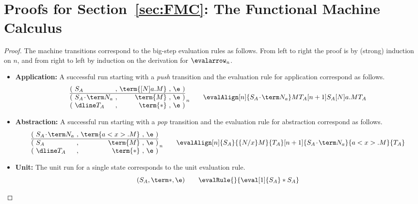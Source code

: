 \documentclass[10pt,a4paper]{amsart}
\newcommand\case[1]{\textbf{#1}}
\newcommand\msep{\kern1pt{\cdot}\kern1pt}
\begin{document}
\appendix
\setcounter{section}{1}

\section{Proofs for Section~\ref{sec:FMC}: The Functional Machine Calculus}

\smallStepBigStep*

\begin{proof}
The machine transitions correspond to the big-step evaluation rules as follows. From left to right the proof is by (strong) induction on $n$, and from right to left by induction on the derivation for $\evalarrow_n$.

\begin{itemize}
\item\case{Application:}
A successful run starting with a \emph{push} transition and the evaluation rule for application correspond as follows.
\[
\begin{array}{@{(~}l@{~,~}r@{~,~}r@{~)}}
          S_A               & \term{[N]a.M} & \e
\\ \hline S_A\msep\term N_a &      \term{M} & \e
\\ \dline T_A               &      \term{*} & \e
\end{array}
\,\raisebox{-4pt}{$\scriptstyle n$}
\qquad
\evalAlign 
  [n]   {S_A\msep\term N_a}       M  {T_A}
  [n+1] {S_A}               {[N]a.M} {T_A}
\]

\item\case{Abstraction:}
A successful run starting with a \emph{pop} transition and the evaluation rule for abstraction correspond as follows.
\[
\begin{array}{@{(~}l@{~,~}r@{~,~}r@{~)}}
          S_A\msep\term N_a & \term{a<x>.M} & \e
\\ \hline S_A               &      \term{M} & \e
\\ \dline T_A               &      \term{*} & \e
\end{array}
\,\raisebox{-4pt}{$\scriptstyle n$}
\qquad  
\evalAlign 
  [n]   {S_A}             {\{N/x\}M} {T_A}
  [n+1] {S_A\msep\term N_a} {a<x>.M} {T_A}
\]

\item\case{Unit:}
The unit run for a single state corresponds to the unit evaluation rule.
\[
	(S_A,\term *,\e) \qquad \evalRule {} {\eval[1]{S_A}*{S_A}}
\]


\end{itemize}
\end{proof}
\end{document}
